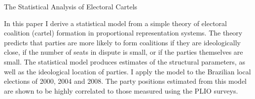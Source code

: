 The Statistical Analysis of Electoral Cartels

In this paper I derive a statistical model from a simple theory of electoral coalition (cartel) formation in proportional representation systems. The theory predicts that parties are more likely to form coalitions if they are ideologically close, if the number of seats in dispute is small, or if the parties themselves are small. The statistical model produces estimates of the structural parameters, as well as the ideological location of parties. I apply the model to the Brazilian local elections of 2000, 2004 and 2008.  The party positions estimated from this model are shown to be highly correlated to those measured using the PLIO surveys. 